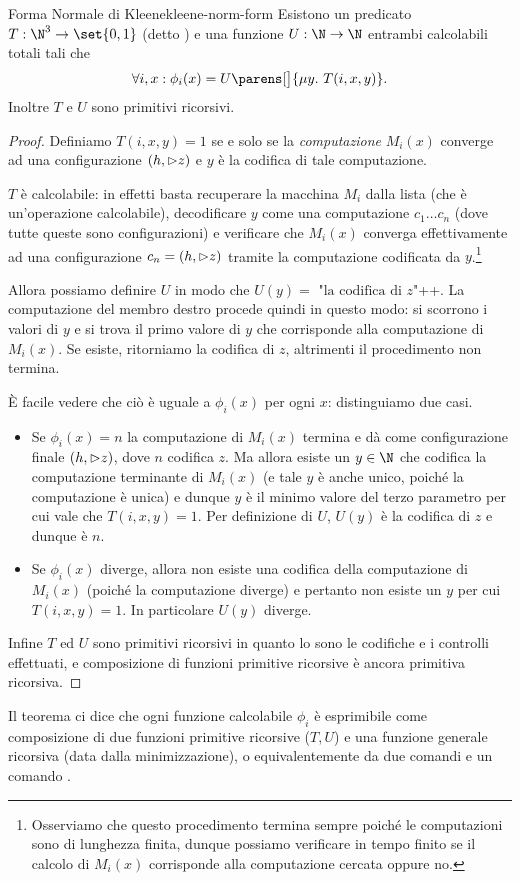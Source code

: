 \begin{theorem}
    {Forma Normale di Kleene}{kleene-norm-form}
    Esistono un predicato $T : \N^3 \to \set{0, 1}$ (detto ) e una funzione $U : \N \to \N$ entrambi calcolabili totali tali che \[
        \forall i, x: \phi_i(x) = U\parens[\big]{\mi{y}{T(i, x, y)}}.
    \] Inoltre $T$ e $U$ sono primitivi ricorsivi. 
\end{theorem}
\begin{proof}
    Definiamo $T(i, x, y) = 1$ se e solo se la \emph{computazione} $M_i(x)$ converge ad una configurazione $(h, {\vartriangleright} z)$ e $y$ è la codifica di tale computazione.
    
    $T$ è calcolabile: in effetti basta recuperare la macchina $M_i$ dalla lista (che è un'operazione calcolabile), decodificare $y$ come una computazione $c_1\dots c_n$ (dove tutte queste sono configurazioni) e verificare che $M_i(x)$ converga effettivamente ad una configurazione $c_n = (h, {\vartriangleright} z)$ tramite la computazione codificata da $y$.\footnote{Osserviamo che questo procedimento termina sempre poiché le computazioni sono di lunghezza finita, dunque possiamo verificare in tempo finito se il calcolo di $M_i(x)$ corrisponde alla computazione cercata oppure no.}
    
    Allora possiamo definire $U$ in modo che $U(y) = \text{ "la codifica di } z$"++. La computazione del membro destro procede quindi in questo modo: si scorrono i valori di $y$ e si trova il primo valore di $y$ che corrisponde alla computazione di $M_i(x)$. Se esiste, ritorniamo la codifica di $z$, altrimenti il procedimento non termina.
    
    È facile vedere che ciò è uguale a $\phi_i(x)$ per ogni $x$: distinguiamo due casi.
    \begin{itemize}
        \item Se $\phi_i(x) = n$ la computazione di $M_i(x)$ termina e dà come configurazione finale $(h, {\vartriangleright} z)$, dove $n$ codifica $z$. Ma allora esiste un $y \in \N$ che codifica la computazione terminante di $M_i(x)$ (e tale $y$ è anche unico, poiché la computazione è unica) e dunque $y$ è il minimo valore del terzo parametro per cui vale che $T(i, x, y) = 1$. Per definizione di $U$, $U(y)$ è la codifica di $z$ e dunque è $n$.
        \item Se $\phi_i(x)$ diverge, allora non esiste una codifica della computazione di $M_i(x)$ (poiché la computazione diverge) e pertanto non esiste un $y$ per cui $T(i, x, y) = 1$. In particolare $U(y)$ diverge.      
    \end{itemize}  

    Infine $T$ ed $U$ sono primitivi ricorsivi in quanto lo sono le codifiche e i controlli effettuati, e composizione di funzioni primitive ricorsive è ancora primitiva ricorsiva.
\end{proof}

\begin{remark}
    Il teorema ci dice che ogni funzione calcolabile $\phi_i$ è esprimibile come composizione di due funzioni primitive ricorsive ($T, U$) e una funzione generale ricorsiva (data dalla minimizzazione), o equivalentemente da due comandi \FOR{} e un comando \WHILE. 
\end{remark}
